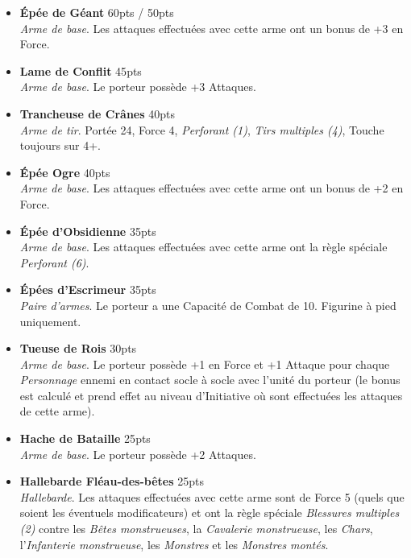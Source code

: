 \begin{multicols}{2}
\begin{itemize}[label={-}]
\item \textbf{Épée de Géant} \dotfill \unit{60}{pts} / \unit{50}{pts} \\
\textit{Arme de base}. Les attaques effectuées avec cette arme ont un bonus de +3 en Force.

\item \textbf{Lame de Conflit} \dotfill \unit{45}{pts} \\
\textit{Arme de base}. Le porteur possède +3 Attaques.

\item \textbf{Trancheuse de Crânes} \dotfill \unit{40}{pts} \\
\textit{Arme de tir}. Portée \unit{24}{\pouce}, Force 4, \emph{Perforant (1)}, \emph{Tirs multiples (4)}, Touche toujours sur 4+.

\item \textbf{Épée Ogre} \dotfill \unit{40}{pts} \\
\textit{Arme de base}. Les attaques effectuées avec cette arme ont un bonus de +2 en Force.

\item \textbf{Épée d'Obsidienne} \dotfill \unit{35}{pts} \\
\textit{Arme de base}. Les attaques effectuées avec cette arme ont la règle spéciale \emph{Perforant (6)}.

\item \textbf{Épées d'Escrimeur} \dotfill \unit{35}{pts} \\
\textit{Paire d'armes}. Le porteur a une Capacité de Combat de 10. Figurine à pied uniquement.

\item \textbf{Tueuse de Rois} \dotfill \unit{30}{pts} \\
\textit{Arme de base}. Le porteur possède +1 en Force et +1 Attaque pour chaque \emph{Personnage} ennemi en contact socle à socle avec l'unité du porteur (le bonus est calculé et prend effet au niveau d'Initiative où sont effectuées les attaques de cette arme).

\item \textbf{Hache de Bataille} \dotfill \unit{25}{pts} \\
\textit{Arme de base}. Le porteur possède +2 Attaques.

\item \textbf{Hallebarde Fléau-des-bêtes} \dotfill \unit{25}{pts} \\
\textit{Hallebarde}. Les attaques effectuées avec cette arme sont de Force 5 (quels que soient les éventuels modificateurs) et ont la règle spéciale \emph{Blessures multiples (2)} contre les \emph{Bêtes monstrueuses}, la \emph{Cavalerie monstrueuse}, les \emph{Chars}, l'\emph{Infanterie monstrueuse}, les \emph{Monstres} et les \emph{Monstres montés}.


\end{itemize}
\end{multicols}
